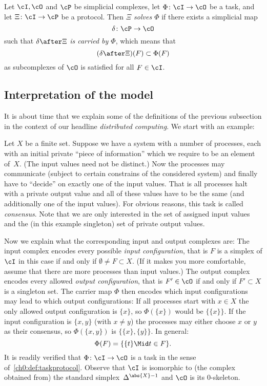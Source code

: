 \begin{thDef}
    Let $\cI,\cO$ and $\cP$ be simplicial complexes,
    let $\Phi\colon\cI\to\cO$ be a task,
    and let $\Xi\colon\cI\to\cP$ be a protocol.
    Then \emph{$\Xi$ solves $\Phi$} if there exists a simplicial map
    \[ \delta\colon\cP\to\cO \] 
    such that $\delta\after\Xi$ \emph{is carried by $\Phi$},
    which means that
    \[ (\delta\after\Xi)(F) \subset \Phi(F) \]
    as subcomplexes of $\cO$ is satisfied for all $F\in\cI$.
\end{thDef}

\subsection{Interpretation of the model}
It is about time that we explain some of the definitions of the previous
subsection in the context of our headline \emph{distributed computing}.
We start with an example:

\begin{thExample}[consensus]
    Let $X$ be a finite set.
    Suppose we have a system with a number of processes, each with an initial
    private \enquote{piece of information} which we require to be an element
    of~$X$. (The input values need not be distinct.) Now the processes may
    communicate (subject to certain constrains of the considered system) and
    finally have to \enquote{decide} on exactly one of the input values. That is
    all processes halt with a private output value and all of these values have
    to be the same (and additionally one of the input values). For obvious
    reasons, this task is called \emph{consensus}. Note that we are only
    interested in the set of assigned input values and the (in this example
    singleton) set of private output values.
    
    Now we explain what the corresponding input and output complexes are:
    The input complex encodes every possible \emph{input configuration},
    that is $F$ is a simplex of $\cI$ in this case if and only if
    $\emptyset\neq F\subset X$. (If it makes you more comfortable, assume that
    there are more processes than input values.) The output complex encodes
    every allowed \emph{output configuration}, that is $F'\in\cO$ if and only
    if $F'\subset X$ is a singleton set. The carrier map $\Phi$ then encodes
    which input configurations may lead to which output configurations:
    If all processes start with $x\in X$ the only allowed output configuration
    is $\{x\}$, so $\Phi(\{x\})$ would be $\{\{x\}\}$. If the input configuration
    is $\{x,y\}$ (with $x\neq y$) the processes may either choose $x$ or $y$
    as their consensus, so $\Phi(\{x,y\})$ is $\{ \{x\}, \{y\} \}$. In general:
    \[ \Phi(F) = \{ \{t\} \Mid t\in F \}  . \]
    It is readily verified that $\Phi\colon\cI\to\cO$ is a task in the sense
    of~\cref{ch0:def:taskprotocol}. Observe that $\cI$ is isomorphic to (the
    complex obtained from) the standard simplex~$\Delta^{\abs{X}-1}$ and $\cO$
    is its $0$-skeleton.
\end{thExample}

